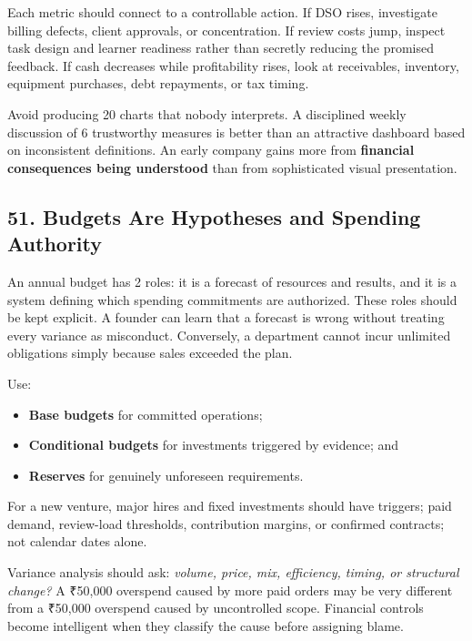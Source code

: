 Each metric should connect to a controllable action. If DSO rises, investigate billing defects, client approvals, or concentration. If review costs jump, inspect task design and learner readiness rather than secretly reducing the promised feedback. If cash decreases while profitability rises, look at receivables, inventory, equipment purchases, debt repayments, or tax timing.

Avoid producing 20 charts that nobody interprets. A disciplined weekly discussion of 6 trustworthy measures is better than an attractive dashboard based on inconsistent definitions. An early company gains more from \textbf{financial consequences being understood} than from sophisticated visual presentation.

\subsection*{51. Budgets Are Hypotheses and Spending Authority}

An annual budget has 2 roles: it is a forecast of resources and results, and it is a system defining which spending commitments are authorized. These roles should be kept explicit. A founder can learn that a forecast is wrong without treating every variance as misconduct. Conversely, a department cannot incur unlimited obligations simply because sales exceeded the plan.

Use:
\begin{itemize}
\item \textbf{Base budgets} for committed operations;
\item \textbf{Conditional budgets} for investments triggered by evidence; and
\item \textbf{Reserves} for genuinely unforeseen requirements.
\end{itemize}
For a new venture, major hires and fixed investments should have triggers; paid demand, review-load thresholds, contribution margins, or confirmed contracts; not calendar dates alone.

Variance analysis should ask: \emph{volume, price, mix, efficiency, timing, or structural change?} A ₹50,000 overspend caused by more paid orders may be very different from a ₹50,000 overspend caused by uncontrolled scope. Financial controls become intelligent when they classify the cause before assigning blame.
